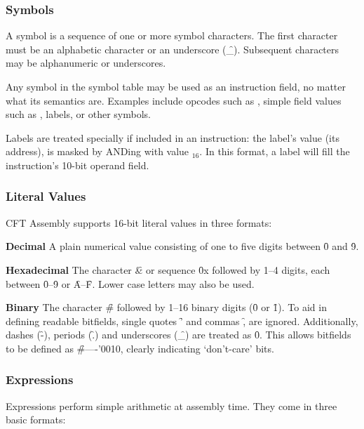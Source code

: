 \subsubsection{Symbols}

A symbol is a sequence of one or more symbol characters. The first character
must be an alphabetic character or an underscore (\f{\_}). Subsequent characters
may be alphanumeric or underscores.

Any symbol in the symbol table may be used as an instruction field, no matter
what its semantics are. Examples include opcodes such as , simple
field values such as , labels, or other symbols.

Labels are treated specially if included in an instruction: the label's value (its
address), is masked by ANDing with value $_{16}$. In this format, a label
will fill the instruction's 10-bit operand field.

\subsubsection{Literal Values}

CFT Assembly supports 16-bit literal values in three formats:

\begin{description}
\item{\bfseries Decimal} A plain numerical value consisting of one to five digits
  between \f{0} and \f{9}.
\item{\bfseries Hexadecimal} The character \f{\&} or sequence \f{0x} followed by 1–4 digits,
  each between \f{0}–\f{9} or \f{A}–\f{F}. Lower case letters may also be used.
\item{\bfseries Binary} The character \f{\#} followed by 1–16 binary digits (\f{0} or
  \f{1}). To aid in defining readable bitfields, single quotes \f{'} and commas
  \f{,} are ignored. Additionally, dashes (\f{-}), periods (\f{.}) and
  underscores (\f{\_}) are treated as \f{0}. This allows bitfields to be
  defined as \f{\#----'0010}, clearly indicating ‘don't-care’ bits.
\end{description}

\subsubsection{Expressions}

Expressions perform simple arithmetic at assembly time. They come in three basic
formats:

